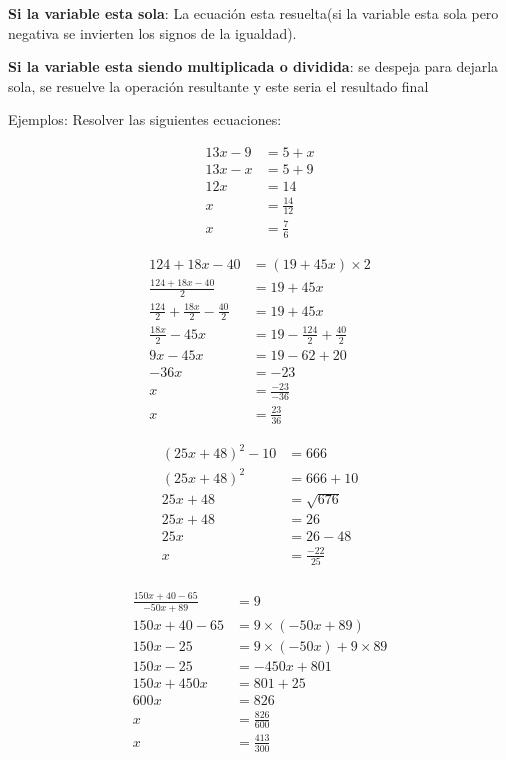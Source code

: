 \documentclass[12pt]{article}
\begin{document}
\begin{itemize}
        \textbf{Si la variable esta sola}: La ecuación esta resuelta(si la variable
        esta sola pero negativa se invierten los signos de la igualdad).

        \textbf{Si la variable esta siendo multiplicada o dividida}: se despeja
        para dejarla sola, se resuelve la operación resultante y este seria el
        resultado final
\end{itemize}

    Ejemplos: Resolver las siguientes ecuaciones:

    \begin{align*}
        13x - 9 &=5 + x		\\
        13x -x &= 5 +9\\
        12x &= 14 \\
        x &= \frac{14}{12} \\
        x&= \frac{7}{6}
    \end{align*}

    \begin{align*}
        124 + 18x -40 &= (19+45x)\times2 		\\
        \frac{124+18x-40}{2}&= 19 + 45x\\
        \frac{124}{2} +\frac{18x}{2} - \frac{40}{2}  &= 19 +45x\\
        \frac{18x}{2} -45x &= 19-\frac{124}{2} +\frac{40}{2} \\
        9x -45x &= 19-62+20\\
        -36x &=-23\\
        x &= \frac{-23}{-36} \\
        x &=\frac{23}{36}
    \end{align*}

    \begin{align*}
        (25x + 48)^2 -10 &= 666 \\
        (25x + 48)^2  &= 666+10 \\
        25x +48 &= \sqrt{676}\\
        25x + 48 &= 26 \\
        25x &= 26-48\\
        x &=  \frac{-22}{25}\\
    \end{align*}

    \begin{align*}
        \frac{150x+40 -65}{-50x +89}  &= 9 		\\
        150x+40-65 &= 9\times(-50x+89)\\
        150x -25 &= 9\times(-50x) + 9\times 89\\
        150x -25 &= -450x + 801\\
        150x + 450x &= 801 + 25\\
        600x &= 826\\
        x&=\frac{826}{600} \\
        x &= \frac{413}{300}
    \end{align*}
\end{document}
